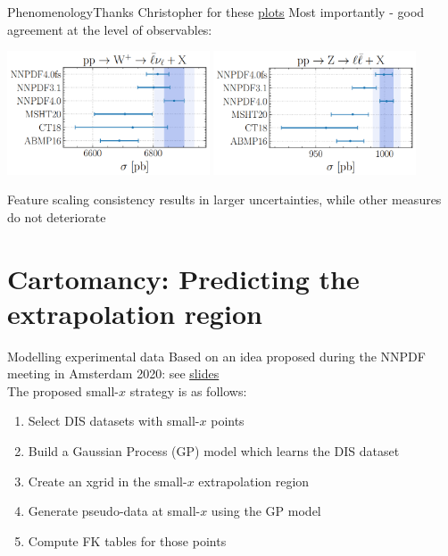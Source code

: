 \documentclass[aspectratio=169,11pt]{beamer}
\newcommand{\nn}{\vspace*{1em}}
\begin{document}
\begin{frame}[t]{Phenomenology}{Thanks Christopher for these {\color{blue} \underline{\href{https://vp.nnpdf.science/de96i8VBQ9Gc-zxl75AMfw==/pheno_featurescaling.pdf}{plots}}}}
  Most importantly - good agreement at the level of observables:
  \begin{center}
    \includegraphics[width=0.45\textwidth]{figures/pheno_w.png} \hfill
    \includegraphics[width=0.45\textwidth]{figures/pheno_z.png}
  \end{center}
  Feature scaling consistency results in larger uncertainties, while other measures do not deteriorate
\end{frame}



\section{Cartomancy: Predicting the extrapolation region}


\begin{frame}[t]{Modelling experimental data}
  Based on an idea proposed during the NNPDF meeting in Amsterdam 2020: see 
  {\color{blue} \underline{\href{https://www.wiki.ed.ac.uk/download/attachments/432523942/carrazza.pdf?version=1&modificationDate=1581344104000&api=v2}{slides}}} \\ \nn
  The proposed small-$x$ strategy is as follows:
  \begin{enumerate}
    \item Select DIS datasets with small-$x$ points
    \item Build a Gaussian Process (GP) model which learns the DIS dataset
    \item Create an xgrid in the small-$x$ extrapolation region
    \item Generate pseudo-data at small-$x$ using the GP model
    \item Compute FK tables for those points
  \end{enumerate} 
\end{frame}
\end{document}
